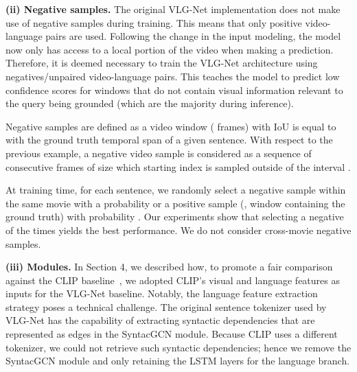 \documentclass[10pt,twocolumn,letterpaper]{article}
\begin{document}
\textbf{(ii) Negative samples.} The original VLG-Net implementation does not make use of negative samples during training. This means that only positive video-language pairs are used. Following the change in the input modeling, the model now only has access to a local portion of the video when making a prediction. Therefore, it is deemed necessary to train the VLG-Net architecture using negatives/unpaired video-language pairs. 
This teaches the model to predict low confidence scores for windows that do not contain visual information relevant to the query being grounded (which are the majority during inference).

Negative samples are defined as a video window ( frames) with IoU is equal to  with the ground truth temporal span of a given sentence. 
With respect to the previous example, a negative video sample is considered as a sequence of consecutive frames of size  which starting index  is sampled outside of the interval .

At training time, for each sentence, we randomly select a negative sample within the same movie with a probability  or a positive sample (\ie, window containing the ground truth) with probability . 
Our experiments show that selecting a negative  of the times yields the best performance. 
We do not consider cross-movie negative samples. 
 
\textbf{(iii) Modules.} In Section 4, we described how, to promote a fair comparison against the CLIP baseline~\cite{radford2021learning}, we adopted CLIP's visual and language features as inputs for the VLG-Net baseline. Notably, the language feature extraction strategy poses a technical challenge.
The original sentence tokenizer used by VLG-Net has the capability of extracting syntactic dependencies that are represented as edges in the SyntacGCN module. Because CLIP uses a different tokenizer, we could not retrieve such syntactic dependencies; hence we remove the SyntacGCN module and only retaining the LSTM layers for the language branch.

 
\end{document}

